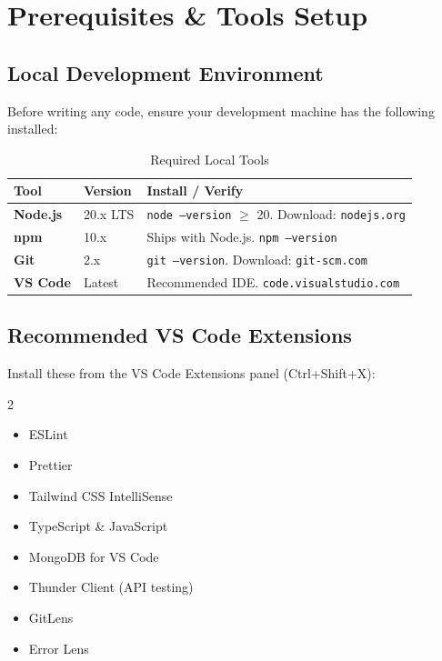 \documentclass[11pt, a4paper]{article}
\begin{document}
\section{Prerequisites \& Tools Setup}

\subsection{Local Development Environment}

Before writing any code, ensure your development machine has the following installed:

\begin{table}[H]
\centering
\small\renewcommand{\arraystretch}{1.3}
\begin{tabularx}{\textwidth}{>{\bfseries}l l X}
\toprule
Tool & Version & Install / Verify \\
\midrule
Node.js    & 20.x LTS   & \texttt{node --version} $\geq$ 20. Download: \texttt{nodejs.org} \\
npm        & 10.x       & Ships with Node.js. \texttt{npm --version} \\
Git        & 2.x        & \texttt{git --version}. Download: \texttt{git-scm.com} \\
VS Code    & Latest     & Recommended IDE. \texttt{code.visualstudio.com} \\
\bottomrule
\end{tabularx}
\caption{Required Local Tools}
\end{table}

\subsection{Recommended VS Code Extensions}

Install these from the VS Code Extensions panel (Ctrl+Shift+X):

\begin{multicols}{2}
\begin{itemize}[leftmargin=1cm, itemsep=1pt, topsep=2pt]
    \item ESLint
    \item Prettier
    \item Tailwind CSS IntelliSense
    \item TypeScript \& JavaScript
    \item MongoDB for VS Code
    \item Thunder Client (API testing)
    \item GitLens
    \item Error Lens
\end{itemize}
\end{multicols}
\end{document}
